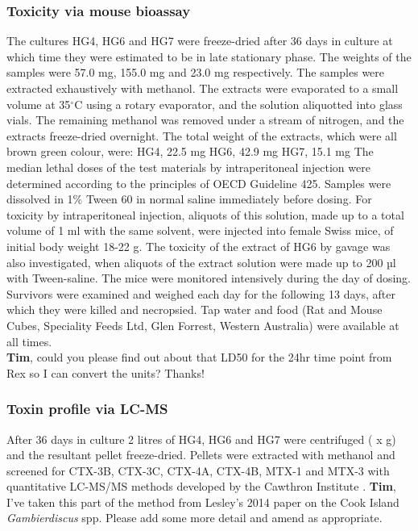 \documentclass[12pt]{article}
\begin{document}
\subsubsection{Toxicity via mouse bioassay}
The cultures HG4, HG6 and HG7 were freeze-dried after 36 days in culture at which time they were estimated to be in late stationary phase. The weights of the samples were 57.0 mg, 155.0 mg and 23.0 mg respectively. The samples were extracted exhaustively with methanol. The extracts were evaporated to a small volume at 35$^{\circ}$C using a rotary evaporator, and the solution aliquotted into glass vials. The remaining methanol was removed under a stream of nitrogen, and the extracts freeze-dried overnight. The total weight of the extracts, which were all brown green colour, were: HG4, 22.5 mg HG6, 42.9 mg HG7, 15.1 mg The median lethal doses of the test materials by intraperitoneal injection were determined according to the principles of OECD Guideline 425. Samples were dissolved in 1\% Tween 60 in normal saline immediately before dosing. For toxicity by intraperitoneal injection, aliquots of this solution, made up to a total volume of 1 ml with the same solvent, were injected into female Swiss mice, of initial body weight 18-22 g. The toxicity of the extract of HG6 by gavage was also investigated, when aliquots of the extract solution were made up to 200 µl with Tween-saline. The mice were monitored intensively during the day of dosing. Survivors were examined and weighed each day for the following 13 days, after which they were killed and necropsied. Tap water and food (Rat and Mouse Cubes, Speciality Feeds Ltd, Glen Forrest, Western Australia) were available at all times.\\
\textbf{Tim}, could you please find out about that LD50 for the 24hr time point from Rex so I can convert the units? Thanks!

\subsubsection{Toxin profile via LC-MS}
After 36 days in culture 2 litres of HG4, HG6 and HG7 were centrifuged (  x g) and the resultant pellet freeze-dried. Pellets were extracted with methanol and screened for CTX-3B, CTX-3C, CTX-4A, CTX-4B, MTX-1 and MTX-3 with quantitative LC-MS/MS methods developed by the Cawthron Institute \citep{kohli2014feeding}.
\textbf{Tim}, I've taken this part of the method from Lesley's 2014 paper on the Cook Island \emph{Gambierdiscus} spp. Please add some more detail and amend as appropriate. 
\end{document}
